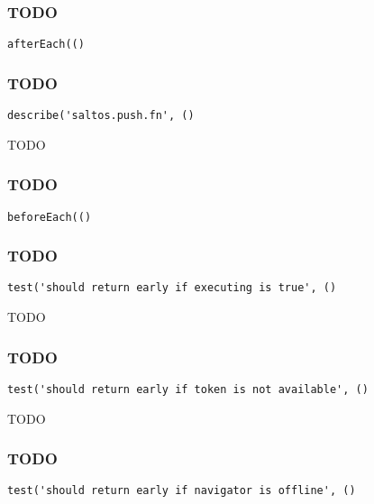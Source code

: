 \documentclass[a4paper]{article}
\begin{document}
\hypertarget{toc683}{}
\subsubsection{TODO}

\begin{lstlisting}
afterEach(()
\end{lstlisting}

\hypertarget{toc684}{}
\subsubsection{TODO}

\begin{lstlisting}
describe('saltos.push.fn', ()
\end{lstlisting}

TODO

\hypertarget{toc685}{}
\subsubsection{TODO}

\begin{lstlisting}
beforeEach(()
\end{lstlisting}

\hypertarget{toc686}{}
\subsubsection{TODO}

\begin{lstlisting}
test('should return early if executing is true', ()
\end{lstlisting}

TODO

\hypertarget{toc687}{}
\subsubsection{TODO}

\begin{lstlisting}
test('should return early if token is not available', ()
\end{lstlisting}

TODO

\hypertarget{toc688}{}
\subsubsection{TODO}

\begin{lstlisting}
test('should return early if navigator is offline', ()
\end{lstlisting}
\end{document}
